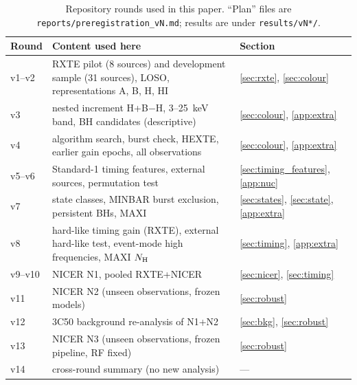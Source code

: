 \documentclass[11pt,a4paper]{article}
\newcommand{\Hcol}{\textsf{H}}
\begin{document}
\begin{table}[h]
\centering\footnotesize
\caption{Repository rounds used in this paper. ``Plan'' files are \texttt{reports/preregistration\_vN.md}; results are under
\texttt{results/vN*/}.}\label{tab:versions}
\begin{tabularx}{\textwidth}{@{}l X l@{}}
\toprule
Round & Content used here & Section \\
\midrule
v1--v2 & RXTE pilot (8 sources) and development sample (31 sources), LOSO, representations A, B, H, HI & \ref{sec:rxte}, \ref{sec:colour} \\
v3 & nested increment \Hcol+B$-$\Hcol, 3--25~keV band, BH candidates (descriptive) & \ref{sec:colour}, \ref{app:extra} \\
v4 & algorithm search, burst check, HEXTE, earlier gain epochs, all observations & \ref{sec:colour}, \ref{app:extra} \\
v5--v6 & Standard-1 timing features, external sources, permutation test & \ref{sec:timing_features}, \ref{app:nuc} \\
v7 & state classes, MINBAR burst exclusion, persistent BHs, MAXI & \ref{sec:states}, \ref{sec:state}, \ref{app:extra} \\
v8 & hard-like timing gain (RXTE), external hard-like test, event-mode high frequencies, MAXI $N_{\rm H}$ & \ref{sec:timing}, \ref{app:extra} \\
v9--v10 & NICER N1, pooled RXTE+NICER & \ref{sec:nicer}, \ref{sec:timing} \\
v11 & NICER N2 (unseen observations, frozen models) & \ref{sec:robust} \\
v12 & 3C50 background re-analysis of N1+N2 & \ref{sec:bkg}, \ref{sec:robust} \\
v13 & NICER N3 (unseen observations, frozen pipeline, RF fixed) & \ref{sec:robust} \\
v14 & cross-round summary (no new analysis) & --- \\
\bottomrule
\end{tabularx}
\end{table}
\end{document}
